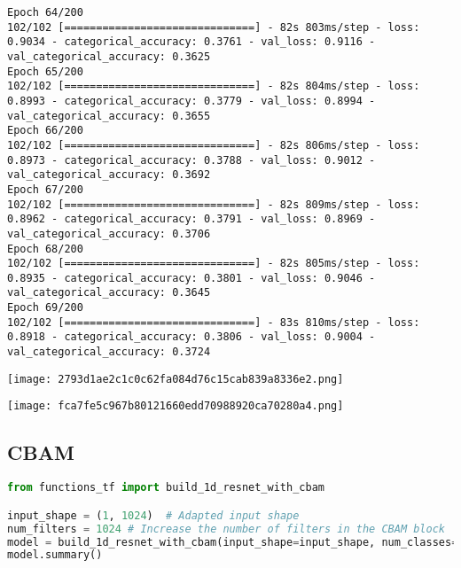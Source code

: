 \begin{lstlisting}
Epoch 64/200
102/102 [==============================] - 82s 803ms/step - loss: 0.9034 - categorical_accuracy: 0.3761 - val_loss: 0.9116 - val_categorical_accuracy: 0.3625
Epoch 65/200
102/102 [==============================] - 82s 804ms/step - loss: 0.8993 - categorical_accuracy: 0.3779 - val_loss: 0.8994 - val_categorical_accuracy: 0.3655
Epoch 66/200
102/102 [==============================] - 82s 806ms/step - loss: 0.8973 - categorical_accuracy: 0.3788 - val_loss: 0.9012 - val_categorical_accuracy: 0.3692
Epoch 67/200
102/102 [==============================] - 82s 809ms/step - loss: 0.8962 - categorical_accuracy: 0.3791 - val_loss: 0.8969 - val_categorical_accuracy: 0.3706
Epoch 68/200
102/102 [==============================] - 82s 805ms/step - loss: 0.8935 - categorical_accuracy: 0.3801 - val_loss: 0.9046 - val_categorical_accuracy: 0.3645
Epoch 69/200
102/102 [==============================] - 83s 810ms/step - loss: 0.8918 - categorical_accuracy: 0.3806 - val_loss: 0.9004 - val_categorical_accuracy: 0.3724
\end{lstlisting}

\texttt{[image: 2793d1ae2c1c0c62fa084d76c15cab839a8336e2.png]}

\texttt{[image: fca7fe5c967b80121660edd70988920ca70280a4.png]}

\hypertarget{cbam}{%
\subsection{CBAM}\label{cbam}}

\begin{lstlisting}[language=Python]
from functions_tf import build_1d_resnet_with_cbam

input_shape = (1, 1024)  # Adapted input shape
num_filters = 1024 # Increase the number of filters in the CBAM block
model = build_1d_resnet_with_cbam(input_shape=input_shape, num_classes=n_elements, num_filters=num_filters, output_shape=(1, n_elements), res_block_num=1)
model.summary()
\end{lstlisting}

